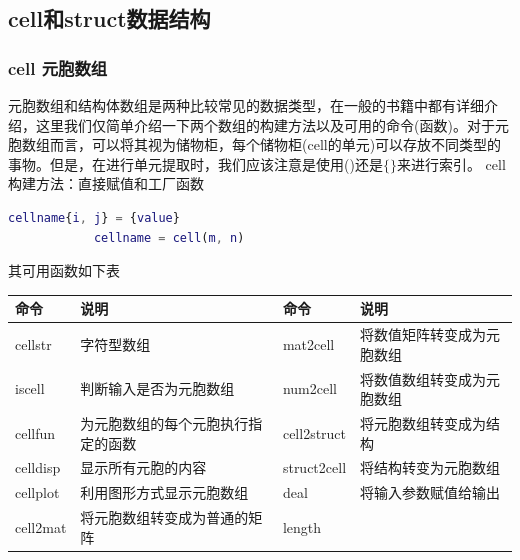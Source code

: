     \subsection{cell和struct数据结构}
        \subsubsection{cell 元胞数组}
            \par
            元胞数组和结构体数组是两种比较常见的数据类型，在一般的书籍中都有详细介绍，这里我们仅简单介绍一下两个数组的构建方法以及可用的命令(函数)。对于元胞数组而言，可以将其视为储物柜，每个储物柜(cell的单元)可以存放不同类型的事物。但是，在进行单元提取时，我们应该注意是使用()还是$\{\}$来进行索引。
            cell构建方法：直接赋值和工厂函数
            \begin{lstlisting}[language = Matlab]
            cellname{i, j} = {value}
            cellname = cell(m, n)
            \end{lstlisting}
            \par
            其可用函数如下表
              \begin{table}[H]
                  \centering
                \begin{tabular}{llll}
                  \toprule
                  命令 & 说明&命令 & 说明\\
                  \midrule
            cellstr& 字符型数组&mat2cell & 将数值矩阵转变成为元胞数组\\
            iscell & 判断输入是否为元胞数组&num2cell & 将数值数组转变成为元胞数组\\
            cellfun &为元胞数组的每个元胞执行指定的函数&cell2struct & 将元胞数组转变成为结构\\
            celldisp & 显示所有元胞的内容&struct2cell & 将结构转变为元胞数组\\
            cellplot & 利用图形方式显示元胞数组&deal & 将输入参数赋值给输出\\
            cell2mat & 将元胞数组转变成为普通的矩阵&length & {}\\
                  \bottomrule
                \end{tabular}
              \end{table}
